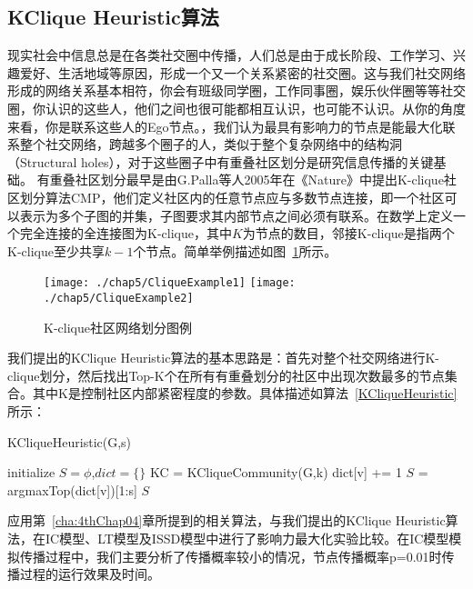 \subsection{KClique Heuristic算法}
现实社会中信息总是在各类社交圈中传播，人们总是由于成长阶段、工作学习、兴趣爱好、生活地域等原因，形成一个又一个关系紧密的社交圈。这与我们社交网络形成的网络关系基本相符，你会有班级同学圈，工作同事圈，娱乐伙伴圈等等社交圈，你认识的这些人，他们之间也很可能都相互认识，也可能不认识。从你的角度来看，你是联系这些人的Ego节点。，我们认为最具有影响力的节点是能最大化联系整个社交网络，跨越多个圈子的人，类似于整个复杂网络中的结构洞（Structural holes）\cite{walker1997social,ahuja2000collaboration,burt2009structural}，对于这些圈子中有重叠社区划分是研究信息传播的关键基础。
有重叠社区划分最早是由G.Palla等人2005年在《Nature》中提出K-clique社区划分算法CMP\cite{palla2005uncovering}，他们定义社区内的任意节点应与多数节点连接，即一个社区可以表示为多个子图的并集，子图要求其内部节点之间必须有联系。在数学上定义一个完全连接的全连接图为K-clique，其中$K$为节点的数目，邻接K-clique是指两个K-clique至少共享$k-1$个节点。简单举例描述如图~\ref{fig:chap05CliqueExample}所示。
\begin{figure}[H]
	\centering%
	{\texttt{[image: ./chap5/CliqueExample1]}}
	{\texttt{[image: ./chap5/CliqueExample2]}}
	
	\caption{K-clique社区网络划分图例}
	\label{fig:chap05CliqueExample}
\end{figure}
我们提出的KClique Heuristic算法的基本思路是：首先对整个社交网络进行K-clique划分，然后找出Top-K个在所有有重叠划分的社区中出现次数最多的节点集合。其中K是控制社区内部紧密程度的参数。具体描述如算法~\ref{KCliqueHeuristic}所示：
\begin{algorithm}
	\caption{KCliqueHeuristic(G,s)}
	\label{KCliqueHeuristic}
	\begin{algorithmic}[1]
		\STATE initialize $S = \phi$,$dict =\{ \} $
		\STATE KC = KCliqueCommunity(G,k)
		\STATE dict[v] += 1
		\ENDIF
		\ENDFOR
		\ENDFOR
		\STATE  $S$ = argmaxTop(dict[v])[1:s]
		\RETURN $S$
	\end{algorithmic}
\end{algorithm}

应用第~\ref{cha:4thChap04}章所提到的相关算法，与我们提出的KClique Heuristic算法，在IC模型、LT模型及ISSD模型中进行了影响力最大化实验比较。在IC模型模拟传播过程中，我们主要分析了传播概率较小的情况，节点传播概率p=0.01时传播过程的运行效果及时间。


